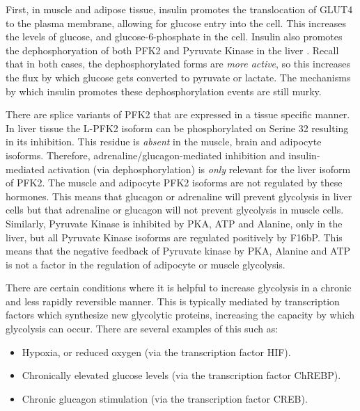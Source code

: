 \documentclass{tufte-handout}
\begin{document}
  First, in muscle and adipose tissue, insulin promotes the translocation of GLUT4 to the plasma membrane, allowing for glucose entry into the cell.  This increases the levels of glucose, and glucose-6-phosphate in the cell.  Insulin also promotes the dephosphoryation of both PFK2 and Pyruvate Kinase in the liver \citep{PROBST1985}. Recall that in both cases, the dephosphorylated forms are \emph{more active}, so this increases the flux by which glucose gets converted to pyruvate or lactate.  The mechanisms by which insulin promotes these dephosphorylation events are still murky.

  There are splice variants of PFK2 that are expressed in a tissue specific manner.  In liver tissue the L-PFK2 isoform can be phosphorylated on Serine 32 resulting in its inhibition.  This residue is \emph{absent} in the muscle, brain and adipocyte isoforms.  Therefore, adrenaline/glucagon-mediated inhibition and insulin-mediated activation (via dephosphorylation) is \emph{only} relevant for the liver isoform of PFK2.  The muscle and adipocyte PFK2 isoforms are not regulated by these hormones.  This means that glucagon or adrenaline will prevent glycolysis in liver cells but that adrenaline or glucagon will not prevent glycolysis in muscle cells.  Similarly, Pyruvate Kinase is inhibited by PKA, ATP and Alanine, only in the liver, but all Pyruvate Kinase isoforms are regulated positively by F16bP.  This means that the negative feedback of Pyruvate kinase by PKA, Alanine and ATP is not a factor in the regulation of adipocyte or muscle glycolysis.  

  There are certain conditions where it is helpful to increase glycolysis in a chronic and less rapidly reversible manner.  This is typically mediated by transcription factors which synthesize new glycolytic proteins, increasing the capacity by which glycolysis can occur.  There are several examples of this such as:

\begin{itemize}
\item Hypoxia, or reduced oxygen (via the transcription factor HIF).
\item Chronically elevated glucose levels (via the transcription factor ChREBP).    
\item Chronic glucagon stimulation (via the transcription factor CREB).
\end{itemize}
\end{document}
